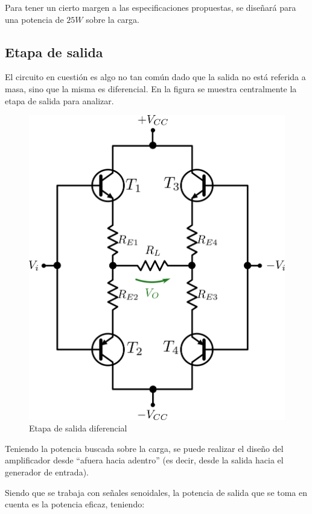 Para tener un cierto margen a las especificaciones propuestas, se diseñará para una potencia de $25W$ sobre la carga.

\newpage

\subsection{Etapa de salida}

El circuito en cuestión es algo no tan común dado que la salida no está referida a masa, sino que la misma es diferencial. En la figura se muestra centralmente la etapa de salida para analizar.

\begin{figure}[!ht]
\begin{centering}
\includegraphics[scale=0.5]{Imagenes/EtapaSalida.png}
\par\end{centering}
\caption{Etapa de salida diferencial}
\end{figure}

Teniendo la potencia buscada sobre la carga, se puede realizar el diseño del amplificador desde ``afuera hacia adentro'' (es decir, desde la salida hacia el generador de entrada).\par
Siendo que se trabaja con señales senoidales, la potencia de salida que se toma en cuenta es la potencia eficaz, teniendo:

